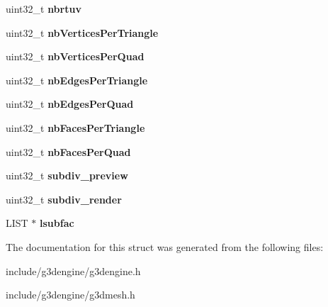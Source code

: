 \begin{DoxyCompactItemize}
\item 
\mbox{\label{struct__G3DSUBDIVIDER_acb3c47fe4cda534db961d865d61a5ed9}} 
uint32\+\_\+t {\bfseries nbrtuv}
\item 
\mbox{\label{struct__G3DSUBDIVIDER_ad68e28cc079fcac4160acef890a6915e}} 
uint32\+\_\+t {\bfseries nb\+Vertices\+Per\+Triangle}
\item 
\mbox{\label{struct__G3DSUBDIVIDER_adb3a3c833631010f15145f10505d1a7a}} 
uint32\+\_\+t {\bfseries nb\+Vertices\+Per\+Quad}
\item 
\mbox{\label{struct__G3DSUBDIVIDER_a86106adf9ebef7e2cc77cf03aec82d41}} 
uint32\+\_\+t {\bfseries nb\+Edges\+Per\+Triangle}
\item 
\mbox{\label{struct__G3DSUBDIVIDER_ac4f4b2c4f6fe4dd02302ba8a1d15c1bb}} 
uint32\+\_\+t {\bfseries nb\+Edges\+Per\+Quad}
\item 
\mbox{\label{struct__G3DSUBDIVIDER_a69369b287cfbf4807cc1b0626e2a01e2}} 
uint32\+\_\+t {\bfseries nb\+Faces\+Per\+Triangle}
\item 
\mbox{\label{struct__G3DSUBDIVIDER_a7c84e48afbba6003f33ae417e7f79ff6}} 
uint32\+\_\+t {\bfseries nb\+Faces\+Per\+Quad}
\item 
\mbox{\label{struct__G3DSUBDIVIDER_a02bbf0a567244c3a9639139f38afe7de}} 
uint32\+\_\+t {\bfseries subdiv\+\_\+preview}
\item 
\mbox{\label{struct__G3DSUBDIVIDER_a045f32ce8c28367fdb147c3063f0eaa9}} 
uint32\+\_\+t {\bfseries subdiv\+\_\+render}
\item 
\mbox{\label{struct__G3DSUBDIVIDER_a4618a001d3773250e12532a628518640}} 
L\+I\+ST $\ast$ {\bfseries lsubfac}
\end{DoxyCompactItemize}


The documentation for this struct was generated from the following files\+:\begin{DoxyCompactItemize}
\item 
include/g3dengine/g3dengine.\+h\item 
include/g3dengine/g3dmesh.\+h\end{DoxyCompactItemize}
